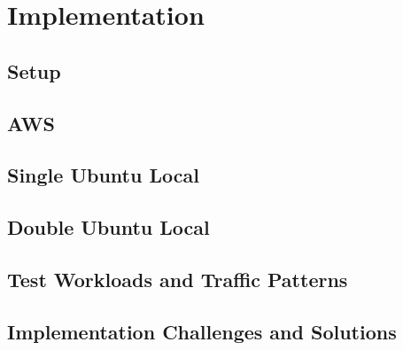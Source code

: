 \chapter{Implementation}

\section{Setup}

\section{AWS}

\section{Single Ubuntu Local}

\section{Double Ubuntu Local}

\section{Test Workloads and Traffic Patterns}

\section{Implementation Challenges and Solutions}